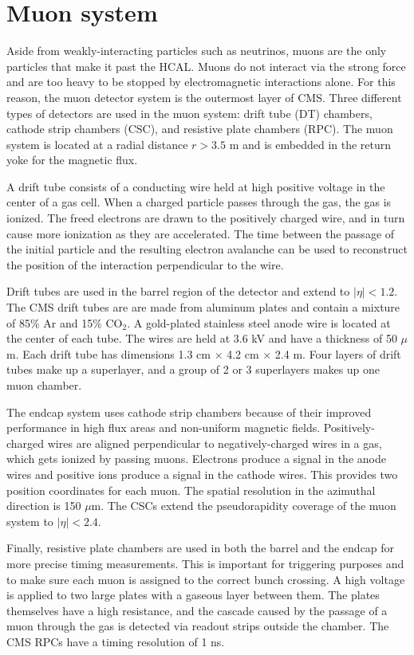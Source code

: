 
\section{Muon system}
\label{sec:Muon}
Aside from weakly-interacting particles such as neutrinos, muons are the only particles that make it past the HCAL. Muons do not interact via the strong force and are too heavy to be stopped by electromagnetic interactions alone. For this reason, the muon detector system is the outermost layer of CMS. Three different types of detectors are used in the muon system: drift tube (DT) chambers, cathode strip chambers (CSC), and resistive plate chambers (RPC). The muon system is located at a radial distance $r > 3.5$ m and is embedded in the return yoke for the magnetic flux.

A drift tube consists of a conducting wire held at high positive voltage in the center of a gas cell. When a charged particle passes through the gas, the gas is ionized. The freed electrons are drawn to the positively charged wire, and in turn cause more ionization as they are accelerated. The time between the passage of the initial particle and the resulting electron avalanche can be used to reconstruct the position of the interaction perpendicular to the wire.

Drift tubes are used in the barrel region of the detector and extend to $|\eta| < 1.2$. The CMS drift tubes are are made from aluminum plates and contain a mixture of 85\% Ar and 15\% CO$_2$. A gold-plated stainless steel anode wire is located at the center of each tube. The wires are held at 3.6 kV and have a thickness of 50 $\mu$m. Each drift tube has dimensions 1.3 cm $\times$ 4.2 cm $\times$ 2.4 m. Four layers of drift tubes make up a superlayer, and a group of 2 or 3 superlayers makes up one muon chamber.

The endcap system uses cathode strip chambers because of their improved performance in high flux areas and non-uniform magnetic fields. Positively-charged wires are aligned perpendicular to negatively-charged wires in a gas, which gets ionized by passing muons. Electrons produce a signal in the anode wires and positive ions produce a signal in the cathode wires. This provides two position coordinates for each muon. The spatial resolution in the azimuthal direction is 150 $\mu$m. The CSCs extend the pseudorapidity coverage of the muon system to $|\eta| < 2.4$.

Finally, resistive plate chambers are used in both the barrel and the endcap for more precise timing measurements. This is important for triggering purposes and to make sure each muon is assigned to the correct bunch crossing. A high voltage is applied to two large plates with a gaseous layer between them. The plates themselves have a high resistance, and the cascade caused by the passage of a muon through the gas is detected via readout strips outside the chamber. The CMS RPCs have a timing resolution of 1 ns. 

